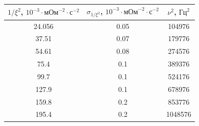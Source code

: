 \documentclass[15pt,a5paper,reqno]{article}
\begin{document}
    \begin{center}
        \begin{tabular}{|c|c|c|}
        \hline
        $1/\xi^2$, $10^{-3}\cdot\text{мОм}^{-2}\cdot\text{с}^{-2}$ & $\sigma_{1/\xi^2}$, $10^{-3}\cdot\text{мОм}^{-2}\cdot\text{с}^{-2}$ & $\nu^2$, $\text{Гц}^2$ \\ \hline\hline
        24.056 & 0.05 & 104976 \\ \hline
        37.51  & 0.07 & 179776   \\ \hline
        54.61  & 0.08 & 274576   \\ \hline
        75.4   & 0.1  & 389376   \\ \hline
        99.7   & 0.1  & 524176   \\ \hline
        127.9  & 0.1 & 678976   \\ \hline
        159.8  & 0.2 & 853776   \\ \hline
        195.4  & 0.2 & 1048576   \\ \hline
        \end{tabular}
    \end{center}
\end{document}
